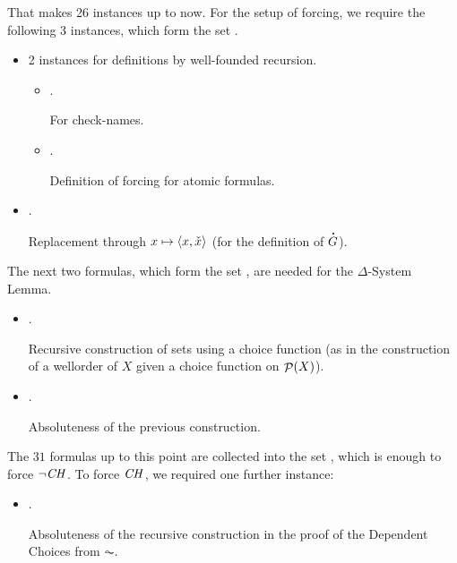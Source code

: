 That makes 26 instances up to now. For the setup of forcing, we
require the following 3 instances, which form the set .
\begin{itemize}
\item 2 instances for definitions by well-founded recursion.
  \begin{itemize}
  \item {}.

    For check-names.
  \item {}.

    Definition of forcing for atomic formulas.
  \end{itemize}
\item
  .

  Replacement through $x\mapsto \langle x,\check{x}\rangle$ (for the
  definition of $\punto{G}$).
\end{itemize}
The next two formulas, which form the set
,
are needed for the $\Delta$-System Lemma.
\begin{itemize}
\item
  .

  Recursive construction of sets using a choice function (as in the
  construction of a wellorder of $X$ given a choice function on $\mathop{\mathcal{P}}(X)$).
\item
  .

  Absoluteness of the previous construction.
\end{itemize}
%
The $31$ formulas up to this point are collected into the set
, which is enough to
force $\neg\mathit{CH}$. To force $\mathit{CH}$, we required one further instance:
%
\begin{itemize}
\item
  .

  Absoluteness of the recursive construction in the proof of the
  Dependent Choices from $\AC$.
\end{itemize}

